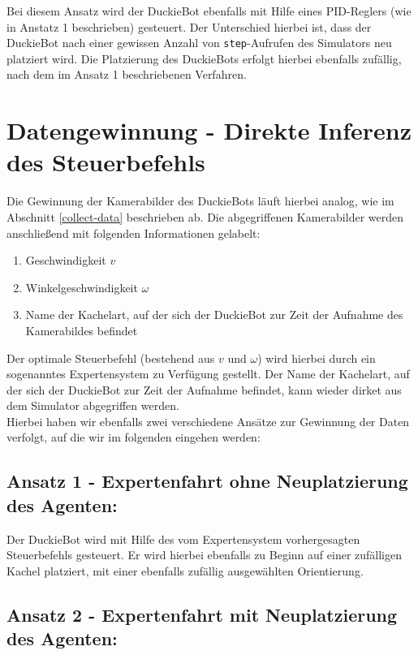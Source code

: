 Bei diesem Ansatz wird der DuckieBot ebenfalls mit Hilfe eines PID-Reglers (wie in Anstatz 1 beschrieben) gesteuert. Der Unterschied hierbei ist, dass der DuckieBot nach einer gewissen Anzahl von \texttt{step}-Aufrufen des Simulators neu platziert wird. Die Platzierung des DuckieBots erfolgt hierbei ebenfalls zufällig, nach dem im Ansatz 1 beschriebenen Verfahren.

\section{Datengewinnung - Direkte Inferenz des Steuerbefehls}

Die Gewinnung der Kamerabilder des DuckieBots läuft hierbei analog, wie im Abschnitt \ref{collect-data} beschrieben ab. Die abgegriffenen Kamerabilder werden anschließend mit folgenden Informationen gelabelt:

\begin{enumerate}
	\item Geschwindigkeit $v$
	\item Winkelgeschwindigkeit $\omega$
	\item Name der Kachelart, auf der sich der DuckieBot zur Zeit der Aufnahme des Kamerabildes befindet
\end{enumerate}


Der optimale Steuerbefehl (bestehend aus $v$ und $\omega$) wird hierbei durch ein sogenanntes Expertensystem zu Verfügung gestellt. Der Name der Kachelart, auf der sich der DuckieBot zur Zeit der Aufnahme befindet, kann wieder dirket aus dem Simulator abgegriffen werden. \\

Hierbei haben wir ebenfalls zwei verschiedene Ansätze zur Gewinnung der Daten verfolgt, auf die wir im folgenden eingehen werden:

\subsection{Ansatz 1 - Expertenfahrt ohne Neuplatzierung des Agenten:}

Der DuckieBot wird mit Hilfe des vom Expertensystem vorhergesagten Steuerbefehls gesteuert. Er wird hierbei ebenfalls zu Beginn auf einer zufälligen Kachel platziert, mit einer ebenfalls zufällig ausgewählten Orientierung.

\subsection{Ansatz 2 - Expertenfahrt mit Neuplatzierung des Agenten:}

